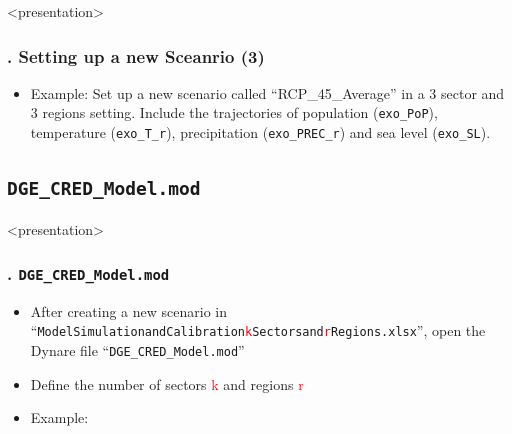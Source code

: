 \documentclass[11pt,aspectratio=169]{beamer}
\begin{document}
\begin{frame}<presentation>
	\frametitle{{\thesection.\thesubsection} Setting up a new Sceanrio (3)}
	\begin{itemize}
		\item Example: Set up a new scenario called ``RCP\_45\_Average'' in a 3 sector and 3 regions setting. Include the trajectories of population (\texttt{exo\_PoP}), temperature (\texttt{exo\_T\_r}), precipitation (\texttt{exo\_PREC\_r}) and sea level (\texttt{exo\_SL}).
		\begin{figure}
		\end{figure}
	\end{itemize}
\end{frame}

\subsection{\texttt{DGE\_CRED\_Model.mod}}

\begin{frame}<presentation>
	\frametitle{{\thesection.\thesubsection} \texttt{DGE\_CRED\_Model.mod}}
	\begin{itemize}
		\item After creating a new scenario in ``\texttt{ModelSimulationandCalibration\textcolor{red}{k}Sectorsand\textcolor{red}{r}Regions.xlsx}'', open the Dynare file ``\texttt{DGE\_CRED\_Model.mod}''
		\item Define the number of sectors \textcolor{red}{k} and regions \textcolor{red}{r}
		\item Example:
		\begin{figure}
		\end{figure}
	\end{itemize}
\end{frame}
\end{document}
